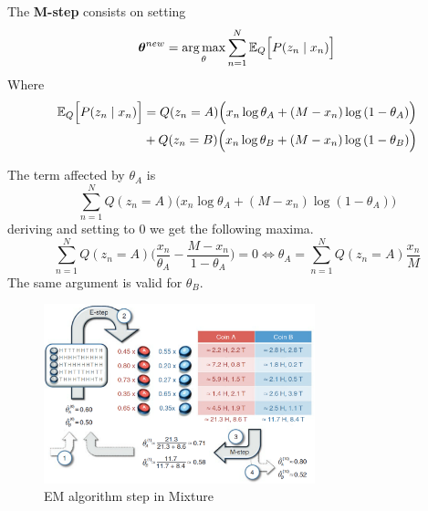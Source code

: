 The \textbf{M-step} consists on setting
\[
  \bm{\theta}^{new} = \operatorname*{arg\,max}_{\theta} \sum_{n=1}^{N}\mathbb{E}_{Q}\Big[P(z_{n} \mid x_{n})\Big]
\]
Where
\[
  \begin{aligned}
    \mathbb{E}_{Q}\Big[P(z_{n} \mid x_{n})\Big] &= Q(z_{n} = A)\Big( x_{n}\log{\theta_{A}} + (M - x_{n})\log{(1 - \theta_{A})} \Big)\\
    &+ Q(z_{n} = B)\Big( x_{n}\log{\theta_{B}} + (M - x_{n})\log{(1 - \theta_{B})} \Big)
  \end{aligned}
\]

The term affected by \(\theta_{A}\) is
\[
  \sum_{n=1}^{N} Q(z_{n}=A) \Big(x_{n}\log{\theta_{A}} + (M - x_{n})\log{(1-\theta_{A})}\Big)
\]
deriving and setting to \(0\) we get the following maxima.
\[
  \sum_{n=1}^{N}Q(z_{n}=A)\Big(\frac{x_{n}}{\theta_{A}} - \frac{M - x_{n}}{1- \theta_{A}}\Big) = 0 \iff \theta_{A} = \sum_{n=1}^{N}Q(z_{n}=A)\frac{x_{n}}{M}
\]
The same argument is valid for \(\theta_{B}\).

\begin{figure}
  \centering
  \includegraphics[width=0.7\textwidth]{chapters/BayesianNetworksLearning/mixture}
  \caption{EM algorithm step in Mixture \cite{do2008expectation}}
  \label{fig:mixture}
\end{figure}

